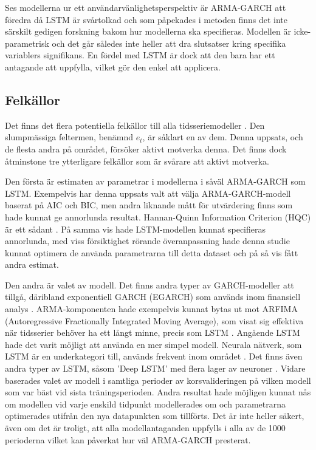 \documentclass[11pt]{article}
\begin{document}
Ses modellerna ur ett användarvänlighetsperspektiv är ARMA-GARCH att föredra då LSTM är svårtolkad och som påpekades i metoden finns det inte särskilt gedigen forskning bakom hur modellerna ska specifieras. Modellen är icke-parametrisk och det går således inte heller att dra slutsatser kring specifika variablers signifikans. En fördel med LSTM är dock att den bara har ett antagande att uppfylla, vilket gör den enkel att applicera. 

\subsection{Felkällor}
Det finns det flera potentiella felkällor till alla tidsseriemodeller \parencite{hyndman2018forecasting}. Den slumpmässiga feltermen, benämnd \(e_t\), är såklart en av dem. Denna uppsats, och de flesta andra på området, försöker aktivt motverka denna. Det finns dock åtminstone tre ytterligare felkällor som är svårare att aktivt motverka. 

Den första är estimaten av parametrar i modellerna i såväl ARMA-GARCH som LSTM. Exempelvis har denna uppsats valt att välja ARMA-GARCH-modell baserat på AIC och BIC, men andra liknande mått för utvärdering finns som hade kunnat ge annorlunda resultat. Hannan-Quinn Information Criterion (HQC) är ett sådant \parencite{hannan1979determination}. På samma vis hade LSTM-modellen kunnat specifieras annorlunda, med viss försiktighet rörande överanpassning hade denna studie kunnat optimera de använda parametrarna till detta dataset och på så vis fått andra estimat. 

Den andra är valet av modell. Det finns andra typer av GARCH-modeller att tillgå, däribland exponentiell GARCH (EGARCH) som används inom finansiell analys \parencite{nelson1991conditional}. ARMA-komponenten hade exempelvis kunnat bytas ut mot ARFIMA (Autoregressive Fractionally Integrated Moving Average), som visat sig effektiva när tidsserier behöver ha ett långt minne, precis som LSTM \parencite{taqqu1995estimators}. Angående LSTM hade det varit möjligt att använda en mer simpel modell. Neurala nätverk, som LSTM är en underkategori till, används frekvent inom området \parencite[se t.ex.][]{rather2015recurrent, li2010applications}. Det finns även andra typer av LSTM, såsom 'Deep LSTM' med flera lager av neuroner \parencite[se applikation i][]{hansson2017stock}. Vidare baserades valet av modell i samtliga perioder av korsvalideringen på vilken modell som var bäst vid sista träningsperioden. Andra resultat hade möjligen kunnat nås om modellen vid varje enskild tidpunkt modellerades om och parametrarna optimerades utifrån den nya datapunkten som tillförts. Det är inte heller säkert, även om det är troligt, att alla modellantaganden uppfylls i alla av de 1000 perioderna vilket kan påverkat hur väl ARMA-GARCH presterat.  
\end{document}
